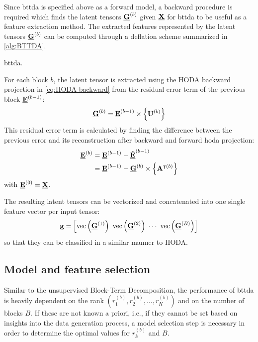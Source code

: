 \documentclass[10pt]{iopart}
\begin{document}
Since \ac{bttda} is specified above as a forward model, a backward procedure
is required which finds the latent tensors $\underline{\mathbf{G}}^{(b)}$ given $\underline{\mathbf{X}}$ for
\ac{bttda} to be useful as a feature extraction method.
The extracted features represented by the latent tensors $\underline{\mathbf{G}}^{(b)}$ can be
computed through a deflation scheme summarized in \cref{alg:BTTDA}.
\begin{algorithm}
  \caption[A \acs{bttda} feature extraction.]{\Ac{bttda}.}
	\label{alg:BTTDA}
	
\end{algorithm}
For each block $b$, the latent tensor is extracted using the HODA backward
projection in \cref{eq:HODA-backward} from the residual error term of the previous
block $\underline{\mathbf{E}}^{(b-1)}$:
\begin{equation}
	\underline{\mathbf{G}}^{(b)} = \underline{\mathbf{E}}^{(b-1)}\times\left\{\mathbf{U}^{(b)}\right\}
\end{equation}
This residual error term is calculated by finding the difference between the
previous error and its reconstruction after backward and forward \ac{hoda}
projection:
\begin{eqnarray}
  \underline{\mathbf{E}}^{(b)}
  & = \underline{\mathbf{E}}^{(b-1)} - \hat{\underline{\mathbf{E}}}^{(b-1)} \\
  & = \underline{\mathbf{E}}^{(b-1)} - \underline{\mathbf{G}}^{(b)}\times\left\{\mathbf{A}^{\intercal(b)}\right\}
\end{eqnarray}
with $\underline{\mathbf{E}}^{(0)}=\underline{\mathbf{X}}$.

The resulting latent tensors can be vectorized and concatenated into
one single feature vector per input tensor:
\begin{equation}
	\mathbf{g}
	=\left[\mathop{\mathrm{vec}}\left(\underline{\mathbf{G}}^{(1)}\right)\
		\mathop{\mathrm{vec}}\left(\underline{\mathbf{G}}^{(2)}\right)\
		\cdots\
		\mathop{\mathrm{vec}}\left(\underline{\mathbf{G}}^{(B)}\right)\right]
\end{equation}
so that they can be classified in a similar manner to HODA.


\subsection{Model and feature selection}
Similar to the unsupervised Block-Term Decomposition, the performance of
\ac{bttda} is
heavily dependent on the rank $(r_1^{(b)}, r_2^{(b)}, \ldots,
	r_K^{(b)})$ and on the number of blocks $B$.
If these are not known a priori, i.e., if they cannot be set based on insights into the
data generation process, a model selection step is necessary in order to
determine the optimal values for $r_k^{(b)}$ and $B$.
\end{document}
